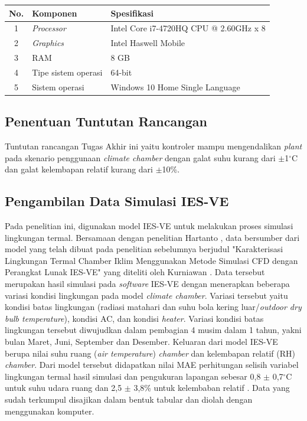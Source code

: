\documentclass[a4paper,10pt]{article}
\makeatletter
\newenvironment{body}{\begin{multicols}{2}}{\end{multicols}}
\renewenvironment{table}
{\def\@captype{table}%
	\captionsetup{format=plain,labelsep=newline,font=footnotesize,textfont=sc,justification=centering}%
	\fontsize{8}{8}\selectfont
}
{}
\makeatother
\begin{document}
\begin{body}
		\begin{table}
			\centering
			\caption{Spesifikasi laptop ASUS N550JX}
			\label{tbl:4:speklaptop}
			\fontsize{8}{8}\selectfont
			\begin{tabularx}{\linewidth}{clX}\toprule
				No. & Komponen & Spesifikasi \\ \toprule
				1 & \textit{Processor} & Intel Core i7-4720HQ CPU @ 2.60GHz x 8 \\ \midrule
				2 & \textit{Graphics} & Intel Haswell Mobile \\ \midrule
				3 & RAM & 8 GB \\ \midrule
				4 & Tipe sistem operasi & 64-bit \\ \midrule
				5 & Sistem operasi & Windows 10 Home Single Language \\ \bottomrule
			\end{tabularx}
		\end{table}
		
		\subsection{Penentuan Tuntutan Rancangan}
		
		Tuntutan rancangan Tugas Akhir ini yaitu kontroler mampu mengendalikan \textit{plant} pada skenario penggunaan \textit{climate chamber} dengan galat suhu kurang dari $\pm$1$^\circ$C dan galat kelembapan relatif kurang dari $\pm$10\%.\\
		
		\subsection{Pengambilan Data Simulasi IES-VE}\label{subsec:lang_bench}
		
		Pada penelitian ini, digunakan model IES-VE untuk melakukan proses simulasi lingkungan termal. Bersamaan dengan penelitian Hartanto \cite{skripsiTanto}, data bersumber dari model yang telah dibuat pada penelitian sebelumnya berjudul "Karakterisasi Lingkungan Termal Chamber Iklim Menggunakan Metode Simulasi CFD dengan Perangkat Lunak IES-VE" yang diteliti oleh Kurniawan \cite{skripsiIchfan}.  Data tersebut merupakan hasil simulasi pada \textit{software} IES-VE dengan menerapkan beberapa variasi kondisi lingkungan pada model \textit{climate chamber}. Variasi tersebut yaitu kondisi batas lingkungan (radiasi matahari dan suhu bola kering luar/\textit{outdoor dry bulb temperature}), kondisi AC, dan kondisi \textit{heater}. Variasi kondisi batas lingkungan tersebut diwujudkan dalam pembagian 4 musim dalam 1 tahun, yakni bulan Maret, Juni, September dan Desember. Keluaran dari model IES-VE berupa nilai suhu ruang (\textit{air temperature}) \textit{chamber} dan kelembapan relatif (RH) \textit{chamber}. Dari model tersebut didapatkan nilai MAE perhitungan selisih variabel lingkungan termal hasil simulasi dan pengukuran lapangan sebesar 0,8 $\pm$ 0,7$^{\circ}$C untuk suhu udara ruang dan 2,5 $\pm$ 3,8\% untuk kelembaban relatif \cite{skripsiIchfan}. Data yang sudah terkumpul disajikan dalam bentuk tabular dan diolah dengan menggunakan komputer.\\
		

\end{body}
\end{document}
